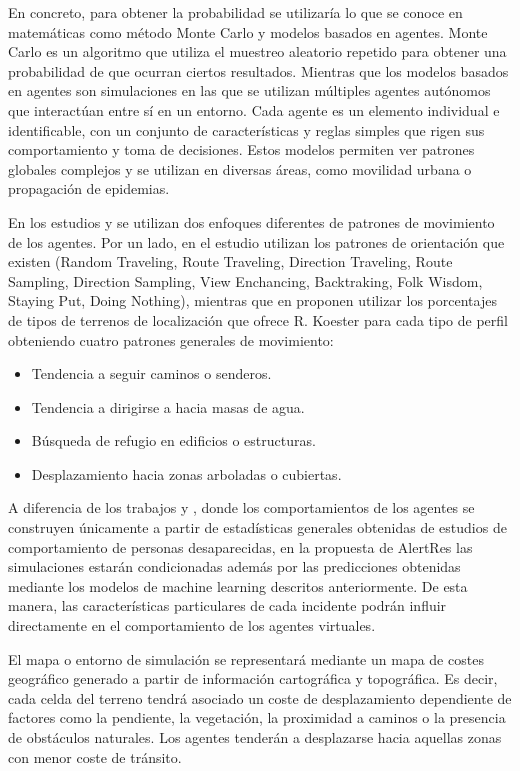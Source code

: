 En concreto, para obtener la probabilidad se utilizaría lo que se conoce en matemáticas como método Monte Carlo y modelos basados en agentes. Monte Carlo es un algoritmo que utiliza el muestreo aleatorio repetido para obtener una probabilidad de que ocurran ciertos resultados\cite{ibm_monte_carlo}. Mientras que los modelos basados en agentes son simulaciones en las que se utilizan múltiples agentes autónomos que interactúan entre sí en un entorno. Cada agente es un elemento individual e identificable, con un conjunto de características y reglas simples que rigen sus comportamiento y toma de decisiones. Estos modelos permiten ver patrones globales complejos y se utilizan en diversas áreas, como movilidad urbana o propagación de epidemias. \cite{MBA_Python}

En los estudios \cite{Agent_based_pred1} y \cite{Agent_based_pred2} se utilizan dos enfoques diferentes de patrones de movimiento de los agentes. Por un lado, en el estudio \cite{Agent_based_pred1} utilizan los patrones de orientación que existen (Random Traveling, Route Traveling, Direction Traveling, Route Sampling, Direction Sampling, View Enchancing, Backtraking, Folk Wisdom, Staying Put, Doing Nothing)\cite{ManualDeBusquedayRescate}, mientras que en \cite{Agent_based_pred2} proponen utilizar los porcentajes de tipos de terrenos de localización que ofrece R. Koester para cada tipo de perfil obteniendo cuatro patrones generales de movimiento:
\begin{itemize}
    \item Tendencia a seguir caminos o senderos.
    \item Tendencia a dirigirse a hacia masas de agua.
    \item Búsqueda de refugio en edificios o estructuras.
    \item Desplazamiento hacia zonas arboladas o cubiertas.
\end{itemize}

A diferencia de los trabajos \cite{Agent_based_pred1} y \cite{Agent_based_pred2}, donde los comportamientos de los agentes se construyen únicamente a partir de estadísticas generales obtenidas de estudios de comportamiento de personas desaparecidas, en la propuesta de AlertRes las simulaciones estarán condicionadas además por las predicciones obtenidas mediante los modelos de machine learning descritos anteriormente. De esta manera, las características particulares de cada incidente podrán influir directamente en el comportamiento de los agentes virtuales.

El mapa o entorno de simulación se representará mediante un mapa de costes geográfico generado a partir de información cartográfica y topográfica. Es decir, cada celda del terreno tendrá asociado un coste de desplazamiento dependiente de factores como la pendiente, la vegetación, la proximidad a caminos o la presencia de obstáculos naturales. Los agentes tenderán a desplazarse hacia aquellas zonas con menor coste de tránsito.

